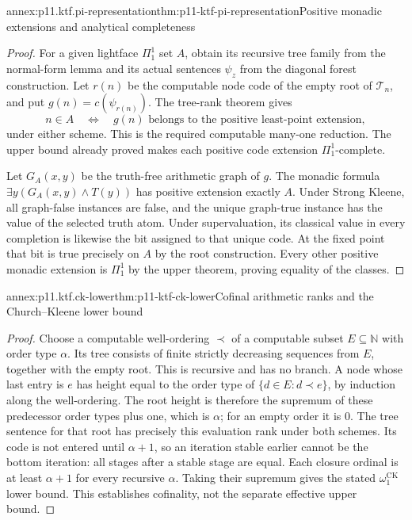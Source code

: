 \begin{annexitem}{annex:p11.ktf.pi-representation}{thm:p11-ktf-pi-representation}{Positive monadic extensions and analytical completeness}
\begin{proof}
For a given lightface \(\Pi^1_1\) set \(A\), obtain its recursive
tree family from the normal-form lemma and its actual sentences
\(\psi_z\) from the diagonal forest construction. Let \(r(n)\)
be the computable node code of the empty root of \(\mathcal T_n\),
and put \(g(n)=c(\psi_{r(n)})\). The tree-rank theorem gives
\[
 n\in A\quad\Longleftrightarrow\quad g(n)
 \text{ belongs to the positive least-point extension},
\]
under either scheme. This is the required computable many-one
reduction. The upper bound already proved makes each positive
code extension \(\Pi^1_1\)-complete.

Let \(G_A(x,y)\) be the truth-free arithmetic graph of \(g\).
The monadic formula
\(\exists y(G_A(x,y)\land T(y))\) has positive extension exactly
\(A\). Under Strong Kleene, all graph-false instances are false,
and the unique graph-true instance has the value of the selected
truth atom. Under supervaluation, its classical value in every
completion is likewise the bit assigned to that unique code.
At the fixed point that bit is true precisely on \(A\) by the
root construction. Every other positive monadic extension is
\(\Pi^1_1\) by the upper theorem, proving equality of the classes.
\end{proof}
\end{annexitem}

\begin{annexitem}{annex:p11.ktf.ck-lower}{thm:p11-ktf-ck-lower}{Cofinal arithmetic ranks and the Church--Kleene lower bound}
\begin{proof}
Choose a computable well-ordering \(\prec\) of a computable
subset \(E\subseteq\mathbb N\) with order type \(\alpha\).
Its tree consists of finite strictly decreasing sequences from
\(E\), together with the empty root. This is recursive and has
no branch. A node whose last entry is \(e\) has height equal
to the order type of \(\{d\in E:d\prec e\}\), by induction
along the well-ordering. The root height is therefore
the supremum of these predecessor order types plus one, which
is \(\alpha\); for an empty order it is \(0\).
The tree sentence for that root has precisely this evaluation
rank under both schemes. Its code is not entered until
\(\alpha+1\), so an iteration stable earlier cannot be the
bottom iteration: all stages after a stable stage are equal.
Each closure ordinal is at least \(\alpha+1\) for every
recursive \(\alpha\). Taking their supremum gives the stated
\(\omega_1^{\mathrm{CK}}\) lower bound. This establishes
cofinality, not the separate effective upper bound.
\end{proof}
\end{annexitem}

